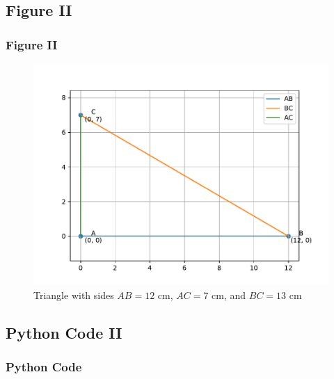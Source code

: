 \documentclass{beamer}
\begin{document}
\subsection{Figure II}
\begin{frame}
    \frametitle{Figure II}
    \begin{figure}[h!]
        \includegraphics[width=0.9\linewidth]{figs/triangle.pdf}
        \caption{Triangle with sides $AB = 12$ cm, $AC = 7$ cm, and $BC = 13$ cm}
    \end{figure}
\end{frame}

\subsection{Python Code II}
\begin{frame}[allowframebreaks]
    \frametitle{Python Code}
    
\end{frame}
\end{document}
